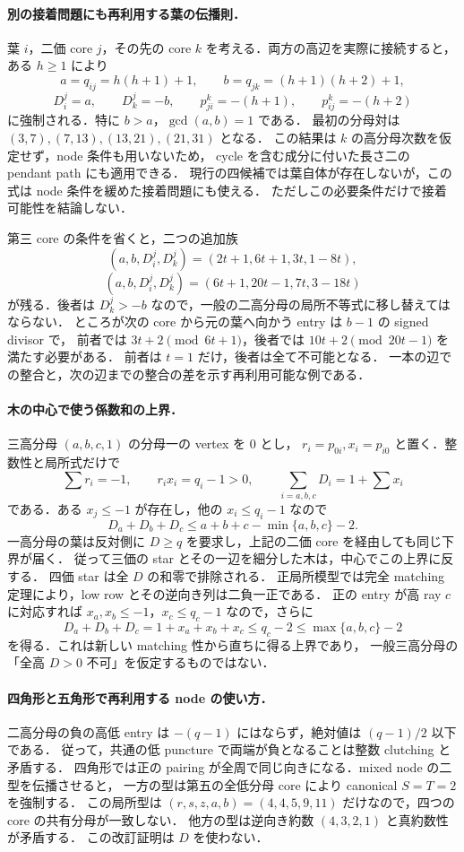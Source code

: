 

\paragraph{別の接着問題にも再利用する葉の伝播則．}
葉 $i$，二価 core $j$，その先の core $k$ を考える．両方の高辺を実際に接続すると，
ある $h\geq1$ により
\[
 a=q_{ij}=h(h+1)+1,\qquad b=q_{jk}=(h+1)(h+2)+1,
\]
\[
 D^j_i=a,\qquad D^j_k=-b,\qquad
 p^k_{ji}=-(h+1),\qquad p^k_{ij}=-(h+2)
\]
に強制される．特に $b>a$，$\gcd(a,b)=1$ である．
最初の分母対は $(3,7),(7,13),(13,21),(21,31)$ となる．
この結果は $k$ の高分母次数を仮定せず，node 条件も用いないため，
cycle を含む成分に付いた長さ二の pendant path にも適用できる．
現行の四候補では葉自体が存在しないが，この式は node 条件を緩めた接着問題にも使える．
ただしこの必要条件だけで接着可能性を結論しない．

第三 core の条件を省くと，二つの追加族
\[
 (a,b,D^j_i,D^j_k)=(2t+1,6t+1,3t,1-8t),
\]
\[
 (a,b,D^j_i,D^j_k)=(6t+1,20t-1,7t,3-18t)
\]
が残る．後者は $D^j_k>-b$ なので，一般の二高分母の局所不等式に移し替えてはならない．
ところが次の core から元の葉へ向かう entry は $b-1$ の signed divisor で，
前者では $3t+2\pmod{6t+1}$，後者では $10t+2\pmod{20t-1}$ を満たす必要がある．
前者は $t=1$ だけ，後者は全て不可能となる．
一本の辺での整合と，次の辺までの整合の差を示す再利用可能な例である．

\paragraph{木の中心で使う係数和の上界．}
三高分母 $(a,b,c,1)$ の分母一の vertex を $0$ とし，
$r_i=p_{0i},x_i=p_{i0}$ と置く．整数性と局所式だけで
\[
 \sum r_i=-1,\qquad r_ix_i=q_i-1>0,\qquad
 \sum_{i=a,b,c}D_i=1+\sum x_i
\]
である．ある $x_j\leq-1$ が存在し，他の $x_i\leq q_i-1$ なので
\[
 D_a+D_b+D_c\leq a+b+c-\min\{a,b,c\}-2.
\]
一高分母の葉は反対側に $D\geq q$ を要求し，上記の二価 core を経由しても同じ下界が届く．
従って三価の star とその一辺を細分した木は，中心でこの上界に反する．
四価 star は全 $D$ の和零で排除される．
正局所模型では完全 matching 定理により，low row とその逆向き列は二負一正である．
正の entry が高 ray $c$ に対応すれば $x_a,x_b\le-1$，$x_c\le q_c-1$ なので，さらに
\[
 D_a+D_b+D_c=1+x_a+x_b+x_c\le q_c-2\le\max\{a,b,c\}-2
\]
を得る．これは新しい matching 性から直ちに得る上界であり，
一般三高分母の「全高 $D>0$ 不可」を仮定するものではない．

\paragraph{四角形と五角形で再利用する node の使い方．}
二高分母の負の高低 entry は $-(q-1)$ にはならず，絶対値は $(q-1)/2$ 以下である．
従って，共通の低 puncture で両端が負となることは整数 clutching と矛盾する．
四角形では正の pairing が全周で同じ向きになる．mixed node の二型を伝播させると，
一方の型は第五の全低分母 core により canonical $S=T=2$ を強制する．
この局所型は $(r,s,z,a,b)=(4,4,5,9,11)$ だけなので，四つの core の共有分母が一致しない．
他方の型は逆向き約数 $(4,3,2,1)$ と真約数性が矛盾する．
この改訂証明は $D$ を使わない．

